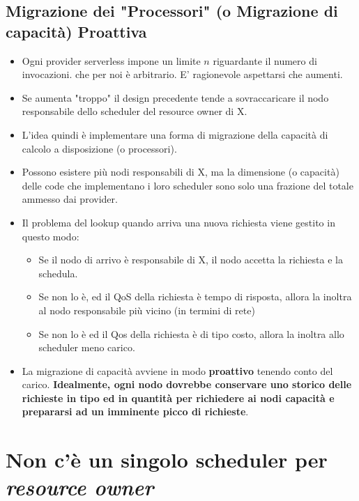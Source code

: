 \documentclass[10pt,a4paper]{report}
\begin{document}
\subsection{Migrazione dei "Processori" (o Migrazione di capacità) Proattiva}

\begin{itemize}
\item Ogni provider serverless impone un limite $n$ riguardante il numero di invocazioni.
che per noi è arbitrario. E' ragionevole aspettarsi che aumenti.

\item Se aumenta "troppo" il design precedente tende a sovraccaricare il nodo responsabile dello scheduler del resource owner di X.

\item L'idea quindi è implementare una forma di migrazione della capacità di calcolo a disposizione (o processori).

\item Possono esistere più nodi responsabili di X, ma la dimensione (o capacità) delle code che implementano i loro scheduler sono solo una frazione del totale ammesso dai provider.

\item Il problema del lookup quando arriva una nuova richiesta viene gestito in questo modo:
\begin{itemize}
\item Se il nodo di arrivo è responsabile di X, il nodo accetta la richiesta e la schedula.
\item Se non lo è, ed il QoS della richiesta è tempo di risposta, allora la inoltra al nodo responsabile più vicino (in termini di rete)

\item Se non lo è ed il Qos della richiesta è di tipo costo, allora la inoltra allo scheduler meno carico.
\end{itemize}

\item La migrazione di capacità avviene in modo \textbf{proattivo} tenendo conto del carico. \textbf{Idealmente, ogni nodo dovrebbe conservare uno storico delle richieste in tipo ed in quantità per richiedere ai nodi capacità e prepararsi ad un imminente picco di richieste}.
\end{itemize}



\section{Non c'è un singolo scheduler per \textit{resource owner}}
\end{document}
